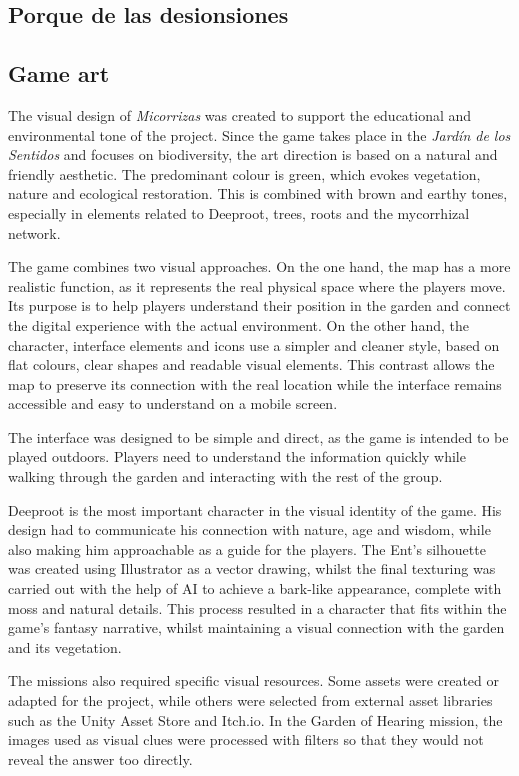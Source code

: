 \subsection{Porque de las desionsiones}


\subsection{Game art}
The visual design of \textit{Micorrizas} was created to support the educational and environmental tone of the project. Since the game takes place in the \textit{Jardín de los Sentidos} and focuses on biodiversity, the art direction is based on a natural and friendly aesthetic. The predominant colour is green, which evokes vegetation, nature and ecological restoration. This is combined with brown and earthy tones, especially in elements related to Deeproot, trees, roots and the mycorrhizal network.

The game combines two visual approaches. On the one hand, the map has a more realistic function, as it represents the real physical space where the players move. Its purpose is to help players understand their position in the garden and connect the digital experience with the actual environment. On the other hand, the character, interface elements and icons use a simpler and cleaner style, based on flat colours, clear shapes and readable visual elements. This contrast allows the map to preserve its connection with the real location while the interface remains accessible and easy to understand on a mobile screen.

The interface was designed to be simple and direct, as the game is intended to be played outdoors. Players need to understand the information quickly while walking through the garden and interacting with the rest of the group. 

Deeproot is the most important character in the visual identity of the game. His design had to communicate his connection with nature, age and wisdom, while also making him approachable as a guide for the players. The Ent’s silhouette was created using Illustrator as a vector drawing, whilst the final texturing was carried out with the help of AI to achieve a bark-like appearance, complete with moss and natural details. This process resulted in a character that fits within the game’s fantasy narrative, whilst maintaining a visual connection with the garden and its vegetation.

The missions also required specific visual resources. Some assets were created or adapted for the project, while others were selected from external asset libraries such as the Unity Asset Store and Itch.io. In the Garden of Hearing mission, the images used as visual clues were processed with filters so that they would not reveal the answer too directly.

